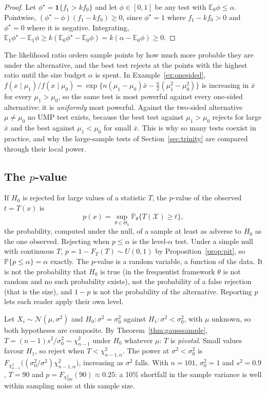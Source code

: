 \documentclass[11pt,a4paper]{article}
\newcommand{\E}{\mathbb{E}}
\renewcommand{\P}{\mathbb{P}}
\newcommand{\N}{\mathcal{N}}
\newcommand{\one}{\mathbf 1}
\begin{document}
\begin{proof}
Let $\phi^\star=\one\{f_1>kf_0\}$ and let $\phi\in[0,1]$ be any test with $\E_0\phi\le\alpha$. Pointwise, $(\phi^\star-\phi)(f_1-kf_0)\ge0$, since $\phi^\star=1$ where $f_1-kf_0>0$ and $\phi^\star=0$ where it is negative. Integrating, $\E_1\phi^\star-\E_1\phi\ge k(\E_0\phi^\star-\E_0\phi)=k(\alpha-\E_0\phi)\ge0$.
\end{proof}

The likelihood ratio orders sample points by how much more probable they are under the alternative, and the best test rejects at the points with the highest ratio until the size budget $\alpha$ is spent. In Example~\ref{ex:onesided}, $f(x\mid\mu_1)/f(x\mid\mu_0)=\exp\{n(\mu_1-\mu_0)\bar x-\frac n2(\mu_1^2-\mu_0^2)\}$ is increasing in $\bar x$ for every $\mu_1>\mu_0$, so the same test is most powerful against every one-sided alternative: it is \emph{uniformly} most powerful. Against the two-sided alternative $\mu\ne\mu_0$ no UMP test exists, because the best test against $\mu_1>\mu_0$ rejects for large $\bar x$ and the best against $\mu_1<\mu_0$ for small $\bar x$. This is why so many tests coexist in practice, and why the large-sample tests of Section~\ref{sec:trinity} are compared through their local power.

\subsection{The $p$-value}\label{sec:pvalue}

If $H_0$ is rejected for large values of a statistic $T$, the $p$-value of the observed $t=T(x)$ is
\[
p(x)=\sup_{\theta\in\Theta_0}\P_\theta\{T(\mathcal X)\ge t\},
\]
the probability, computed under the null, of a sample at least as adverse to $H_0$ as the one observed. Rejecting when $p\le\alpha$ is the level-$\alpha$ test. Under a simple null with continuous $T$, $p=1-F_T(T)\sim U(0,1)$ by Proposition~\ref{prop:pit}, so $\P\{p\le\alpha\}=\alpha$ exactly. The $p$-value is a random variable, a function of the data. It is not the probability that $H_0$ is true (in the frequentist framework $\theta$ is not random and no such probability exists), not the probability of a false rejection (that is the size), and $1-p$ is not the probability of the alternative. Reporting $p$ lets each reader apply their own level.

\begin{example}
Let $X_i\sim\N(\mu,\sigma^2)$ and $H_0:\sigma^2=\sigma_0^2$ against $H_1:\sigma^2<\sigma_0^2$, with $\mu$ unknown, so both hypotheses are composite. By Theorem~\ref{thm:gausssample}, $T=(n-1)s^2/\sigma_0^2\sim\chi^2_{n-1}$ under $H_0$ whatever $\mu$: $T$ is \emph{pivotal}. Small values favour $H_1$, so reject when $T<\chi^2_{n-1,\alpha}$. The power at $\sigma^2<\sigma_0^2$ is $F_{\chi^2_{n-1}}\big((\sigma_0^2/\sigma^2)\chi^2_{n-1,\alpha}\big)$, increasing as $\sigma^2$ falls. With $n=101$, $\sigma_0^2=1$ and $s^2=0.9$, $T=90$ and $p=F_{\chi^2_{100}}(90)\approx0.25$: a 10\% shortfall in the sample variance is well within sampling noise at this sample size.
\end{example}
\end{document}
